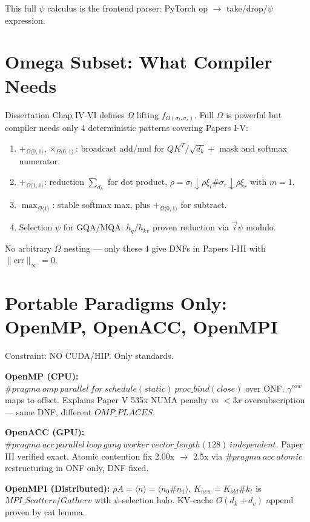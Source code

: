 \documentclass[11pt,a4paper]{article}
\begin{document}
This full $\psi$ calculus is the frontend parser: PyTorch op $\rightarrow$ take/drop/$\psi$ expression.

\section{Omega Subset: What Compiler Needs}

Dissertation Chap IV-VI defines $\Omega$ lifting $f_{\Omega(\sigma_l,\sigma_r)}$. Full $\Omega$ is powerful but compiler needs only 4 deterministic patterns covering Papers I-V:

\begin{enumerate}
\item $+_{\Omega\langle0,1\rangle}, \times_{\Omega\langle0,1\rangle}$: broadcast add/mul for $QK^T/\sqrt{d_k}+$ mask and softmax numerator.
\item $+_{\Omega\langle1,1\rangle}$: reduction $\sum_{d_k}$ for dot product, $\rho = \sigma_l\downarrow\rho\xi_l\#\sigma_r\downarrow\rho\xi_r$ with $m=1$.
\item $\max_{\Omega\langle1\rangle}$: stable softmax max, plus $+_{\Omega\langle0,1\rangle}$ for subtract.
\item Selection $\psi$ for GQA/MQA: $h_q/h_{kv}$ proven reduction via $\vec i\psi$ modulo.
\end{enumerate}

No arbitrary $\Omega$ nesting — only these 4 give DNFs in Papers I-III with $\|\text{err}\|_\infty=0$.

\section{Portable Paradigms Only: OpenMP, OpenACC, OpenMPI}

Constraint: NO CUDA/HIP. Only standards.

\textbf{OpenMP (CPU):} $\#pragma\ omp\ parallel\ for\ schedule(static)\ proc\_bind(close)$ over ONF. $\gamma^{row}$ maps to offset. Explains Paper V 535x NUMA penalty vs $<3x$ oversubscription — same DNF, different $OMP\_PLACES$.

\textbf{OpenACC (GPU):} $\#pragma\ acc\ parallel\ loop\ gang\ worker\ vector\_length(128)\ independent$. Paper III verified exact. Atomic contention fix 2.00x $\rightarrow$ 2.5x via $\#pragma\ acc\ atomic$ restructuring in ONF only, DNF fixed.

\textbf{OpenMPI (Distributed):} $\rho A = \langle n\rangle = \langle n_0\#n_1\rangle$. $K_{new}=K_{old}\#k_t$ is $MPI\_Scatterv/Gatherv$ with $\psi$-selection halo. KV-cache $O(d_k+d_v)$ append proven by cat lemma.
\end{document}
